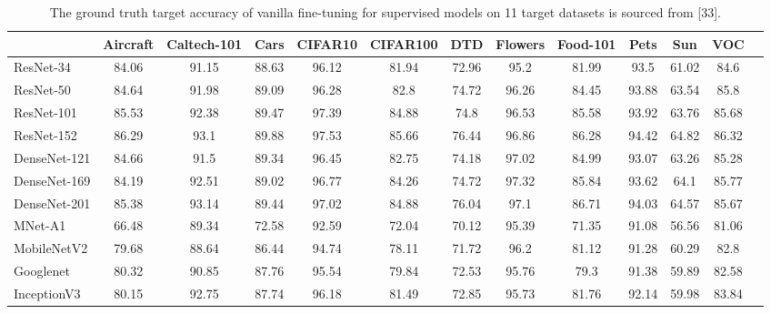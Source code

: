 \begin{table*}\setlength\tabcolsep{5pt}
\footnotesize
    \centering
    \caption{The ground truth target accuracy of vanilla fine-tuning for supervised models on 11 target datasets is sourced from [33].}
    \label{tab:vanilla_ft_supervised}
    \begin{adjustbox}{max width=\textwidth}
    \begin{tabular}{lcccccccccccc}
        \toprule
        & Aircraft & Caltech-101 & Cars  & CIFAR10 & CIFAR100 & DTD   & Flowers & Food-101 & Pets  & Sun & VOC  \\
        \midrule
        ResNet-34 & 84.06 & 91.15 & 88.63 & 96.12 & 81.94 & 72.96 & 95.2 & 81.99 & 93.5 & 61.02 & 84.6 \\
        ResNet-50 & 84.64 & 91.98 & 89.09 & 96.28 & 82.8 & 74.72 & 96.26 & 84.45 & 93.88 & 63.54 & 85.8 \\
        ResNet-101 & 85.53 & 92.38 & 89.47 & 97.39 & 84.88 & 74.8 & 96.53 & 85.58 & 93.92 & 63.76 & 85.68 \\
        ResNet-152 & 86.29 & 93.1 & 89.88 & 97.53 & 85.66 & 76.44 & 96.86 & 86.28 & 94.42 & 64.82 & 86.32 \\
        DenseNet-121 & 84.66 & 91.5 & 89.34 & 96.45 & 82.75 & 74.18 & 97.02 & 84.99 & 93.07 & 63.26 & 85.28 \\
        DenseNet-169 & 84.19 & 92.51 & 89.02 & 96.77 & 84.26 & 74.72 & 97.32 & 85.84 & 93.62 & 64.1 & 85.77 \\
        DenseNet-201 & 85.38 & 93.14 & 89.44 & 97.02 & 84.88 & 76.04 & 97.1 & 86.71 & 94.03 & 64.57 & 85.67 \\
        MNet-A1 & 66.48 & 89.34 & 72.58 & 92.59 & 72.04 & 70.12 & 95.39 & 71.35 & 91.08 & 56.56 & 81.06 \\
        MobileNetV2 & 79.68 & 88.64 & 86.44 & 94.74 & 78.11 & 71.72 & 96.2 & 81.12 & 91.28 & 60.29 & 82.8 \\
        Googlenet & 80.32 & 90.85 & 87.76 & 95.54 & 79.84 & 72.53 & 95.76 & 79.3 & 91.38 & 59.89 & 82.58 \\
        InceptionV3 & 80.15 & 92.75 & 87.74 & 96.18 & 81.49 & 72.85 & 95.73 & 81.76 & 92.14 & 59.98 & 83.84 \\
        \bottomrule
    \end{tabular}
    \end{adjustbox}
\end{table*}


